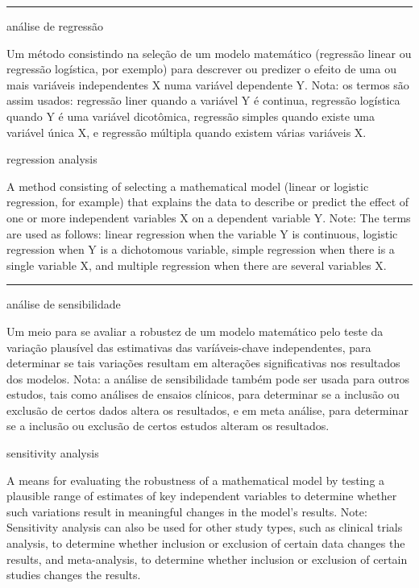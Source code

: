 \documentclass[
  openany]{book}
\begin{document}
\begin{center}\rule{0.5\linewidth}{0.5pt}\end{center}

análise de regressão

Um método consistindo na seleção de um modelo matemático (regressão linear ou regressão logística, por exemplo) para descrever ou predizer o efeito de uma ou mais variáveis independentes X numa variável dependente Y. Nota: os termos são assim usados: regressão liner quando a variável Y é continua, regressão logística quando Y é uma variável dicotômica, regressão simples quando existe uma variável única X, e regressão múltipla quando existem várias variáveis X.

regression analysis

A method consisting of selecting a mathematical model (linear or logistic regression, for example) that explains the data to describe or predict the effect of one or more independent variables X on a dependent variable Y. Note: The terms are used as follows: linear regression when the variable Y is continuous, logistic regression when Y is a dichotomous variable, simple regression when there is a single variable X, and multiple regression when there are several variables X.

\begin{center}\rule{0.5\linewidth}{0.5pt}\end{center}

análise de sensibilidade

Um meio para se avaliar a robustez de um modelo matemático pelo teste da variação plausível das estimativas das varíáveis-chave independentes, para determinar se tais variações resultam em alterações significativas nos resultados dos modelos. Nota: a análise de sensibilidade também pode ser usada para outros estudos, tais como análises de ensaios clínicos, para determinar se a inclusão ou exclusão de certos dados altera os resultados, e em meta análise, para determinar se a inclusão ou exclusão de certos estudos alteram os resultados.

sensitivity analysis

A means for evaluating the robustness of a mathematical model by testing a plausible range of estimates of key independent variables to determine whether such variations result in meaningful changes in the model's results. Note: Sensitivity analysis can also be used for other study types, such as clinical trials analysis, to determine whether inclusion or exclusion of certain data changes the results, and meta-analysis, to determine whether inclusion or exclusion of certain studies changes the results.
\end{document}
